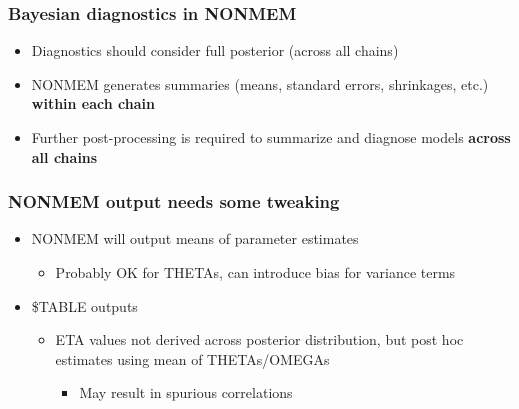 \documentclass{beamer}
\begin{document}
\begin{frame}
  \frametitle{Bayesian diagnostics in NONMEM}

\begin{itemize}
  \item<1-> Diagnostics should consider full posterior (across all chains)
  \item<2-> NONMEM generates summaries (means, standard errors, shrinkages, etc.) \textcolor{mrggreen}{\bf within each chain}
  \item<3-> Further post-processing is required to summarize and diagnose models \textcolor{mrggreen}{\bf across all chains}
\end{itemize}

\end{frame}

\begin{frame}
  \frametitle{NONMEM output needs some tweaking}

\begin{itemize}
  \item<1-> NONMEM will output means of parameter estimates
        \begin{itemize}
          \item Probably OK for THETAs, can introduce bias for variance terms
        \end{itemize}
  \item<2-> \$TABLE outputs
        \begin{itemize}
          \item ETA values not derived across posterior distribution, but post hoc estimates using mean of THETAs/OMEGAs
                \begin{itemize}
                  \item May result in spurious correlations
                \end{itemize}
        \end{itemize}
\end{itemize}

\end{frame}
\end{document}
